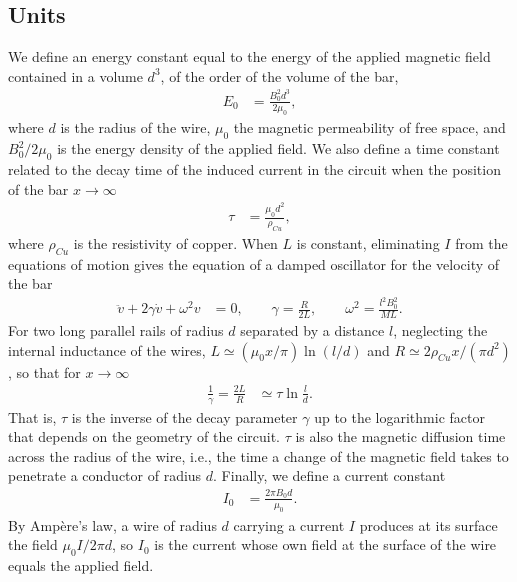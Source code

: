\documentclass[11pt]{article}
\begin{document}
\subsection{Units}
We define an energy constant equal to the energy of the applied magnetic field contained in a volume $d^3$, of the order of the volume of the bar,
\begin{align}
  E_0&=\frac{B_0^2d^3}{2\mu_0},
\end{align}
where $d$ is the radius of the wire, $\mu_0$ the magnetic permeability of free space, and $B_0^2/2\mu_0$ is the energy density of the applied field. We also define a time constant related to the decay time of the induced current in the circuit when the position of the bar $x\rightarrow\infty$
\begin{align}
  \tau&=\frac{\mu_0d^2}{\rho_{Cu}},
\end{align}
where $\rho_{Cu}$ is the resistivity of copper. When $L$ is constant, eliminating $I$ from the equations of motion gives the equation of a damped oscillator for the velocity of the bar
\begin{align}
  \ddot{v}+2\gamma\dot{v}+\omega^2v&=0,\qquad\gamma=\frac{R}{2L},\qquad\omega^2=\frac{l^2B_0^2}{ML}.
  \label{oscillator}
\end{align}
For two long parallel rails of radius $d$ separated by a distance $l$, neglecting the internal inductance of the wires, $L\simeq(\mu_0x/\pi)\ln(l/d)$ and $R\simeq2\rho_{Cu}x/(\pi d^2)$, so that for $x\rightarrow\infty$
\begin{align}
  \frac{1}{\gamma}=\frac{2L}{R}&\simeq\tau\ln\frac{l}{d}.
\end{align}
That is, $\tau$ is the inverse of the decay parameter $\gamma$ up to the logarithmic factor that depends on the geometry of the circuit. $\tau$ is also the magnetic diffusion time across the radius of the wire, i.e., the time a change of the magnetic field takes to penetrate a conductor of radius $d$. Finally, we define a current constant
\begin{align}
  I_0&=\frac{2\pi B_0d}{\mu_0}.
\end{align}
By Amp\`ere's law, a wire of radius $d$ carrying a current $I$ produces at its surface the field $\mu_0I/2\pi d$, so $I_0$ is the current whose own field at the surface of the wire equals the applied field.\\
\end{document}
